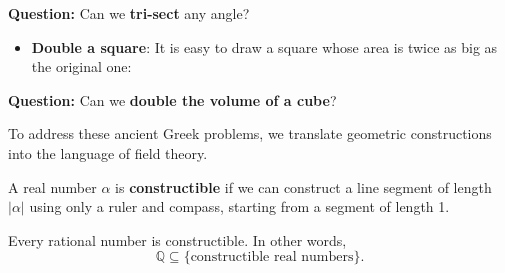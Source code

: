 \begin{center}
\begin{tikzpicture}[>=stealth, scale=1.5]
\end{tikzpicture}
\end{center}

\textbf{Question:} Can we \textbf{tri-sect} any angle?

\begin{itemize}
    \item \textbf{Double a square}: It is easy to draw a square whose area is twice as big as the original one:
\end{itemize}

\begin{center}
\end{center}

\textbf{Question:} Can we \textbf{double the volume of a cube}?

\bigskip
To address these ancient Greek problems, we translate geometric constructions into the language of field theory.

\begin{definition}
A real number $\alpha$ is \textbf{constructible} if we can construct a line segment of length $|\alpha|$ using only a ruler and compass, starting from a segment of length 1.
\end{definition}

\begin{proposition}
Every rational number is constructible. In other words,
\[
\mathbb{Q}\subseteq \{\text{constructible real numbers}\}.
\]
\end{proposition}

